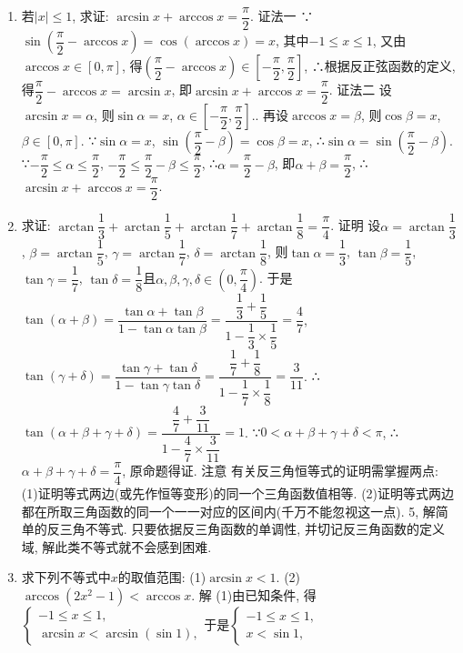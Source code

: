 \documentclass[10pt,a4paper]{article}
\begin{document}
\begin{enumerate}[1.]
\item 若$|x|\le 1$, 求证: $\arcsin x+\arccos x=\dfrac{\pi }2$.
证法一  ∵$\sin (\dfrac{\pi }2-\arccos x)=\cos (\arccos x)=x$, 其中$-1\le x\le 1$,
又由$\arccos x\in [0,\pi]$, 得$(\dfrac{\pi }2-\arccos x)\in [-\dfrac{\pi }2,\dfrac{\pi }2]$,
∴根据反正弦函数的定义, 得$\dfrac{\pi }2-\arccos x=\arcsin x$, 即$\arcsin x+\arccos x=\dfrac{\pi }2$.
证法二  设$\arcsin x=\alpha$, 则$\sin \alpha =x$, $\alpha \in [-\dfrac{\pi }2,\dfrac{\pi }2]$..
再设$\arccos x=\beta$, 则$\cos \beta =x$, $\beta \in [0,\pi]$.
∵$\sin \alpha =x$, $\sin (\dfrac{\pi }2-\beta)=\cos \beta =x$, ∴$\sin \alpha =\sin (\dfrac{\pi }2-\beta)$.
∵$-\dfrac{\pi }2\le \alpha \le \dfrac{\pi }2$, $-\dfrac{\pi }2\le \dfrac{\pi }2-\beta \le \dfrac{\pi }2$, ∴$\alpha =\dfrac{\pi }2-\beta$,
即$\alpha +\beta =\dfrac{\pi }2$, ∴$\arcsin x+\arccos x=\dfrac{\pi }2$.
\item 求证: $\arctan \dfrac 13+\arctan \dfrac 15+\arctan \dfrac 17+\arctan \dfrac 18=\dfrac{\pi }4$.
证明  设$\alpha =\arctan \dfrac 13$, $\beta =\arctan \dfrac 15$, $\gamma =\arctan \dfrac 17$, $\delta =\arctan \dfrac 18$,
则$\tan \alpha =\dfrac 13$, $\tan \beta =\dfrac 15$, $\tan \gamma =\dfrac 17$, $\tan \delta =\dfrac 18$且$\alpha ,\beta ,\gamma ,\delta \in (0,\dfrac{\pi }4)$.
于是$\tan (\alpha +\beta)=\dfrac{\tan \alpha +\tan \beta }{1-\tan \alpha \tan \beta }=\dfrac{\dfrac 13+\dfrac 15}{1-\dfrac 13\times \dfrac 15}=\dfrac 47$,
$\tan (\gamma +\delta)=\dfrac{\tan \gamma +\tan \delta }{1-\tan \gamma \tan \delta }=\dfrac{\dfrac 17+\dfrac 18}{1-\dfrac 17\times \dfrac 18}=\dfrac 3{11}$.
∴$\tan (\alpha +\beta +\gamma +\delta)=\dfrac{\dfrac 47+\dfrac 3{11}}{1-\dfrac 47\times \dfrac 3{11}}=1$.
∵$0<\alpha +\beta +\gamma +\delta <\pi$, ∴$\alpha +\beta +\gamma +\delta =\dfrac{\pi }4$, 原命题得证.
注意  有关反三角恒等式的证明需掌握两点:
(1)证明等式两边(或先作恒等变形)的同一个三角函数值相等.
(2)证明等式两边都在所取三角函数的同一个一一对应的区间内(千万不能忽视这一点).
5, 解简单的反三角不等式.
只要依据反三角函数的单调性, 并切记反三角函数的定义域, 解此类不等式就不会感到困难.
\item 求下列不等式中$x$的取值范围:
(1)$\arcsin x<1$.						(2)$\arccos (2x^2-1)<\arccos x$.
解  (1)由已知条件, 得$\begin{cases} -1\le x\le 1, \\ \arcsin x<\arcsin (\sin 1), \end{cases}$于是$\begin{cases} -1\le x\le 1, \\ x<\sin 1, \end{cases}$

\end{enumerate}
\end{document}
